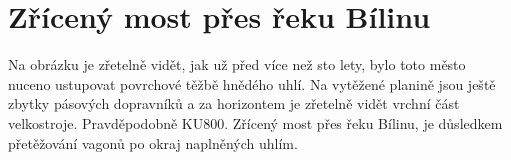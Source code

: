 

\chapter{Zřícený most přes řeku Bílinu}


Na obrázku je zřetelně vidět, jak už před více než sto lety, bylo toto město
nuceno ustupovat povrchové těžbě hnědého uhlí. Na vytěžené planině jsou ještě
zbytky pásových dopravníků a za horizontem je zřetelně vidět vrchní část
velkostroje. Pravděpodobně KU800. Zřícený most přes řeku Bílinu, je důsledkem
přetěžování vagonů po okraj naplněných uhlím.
